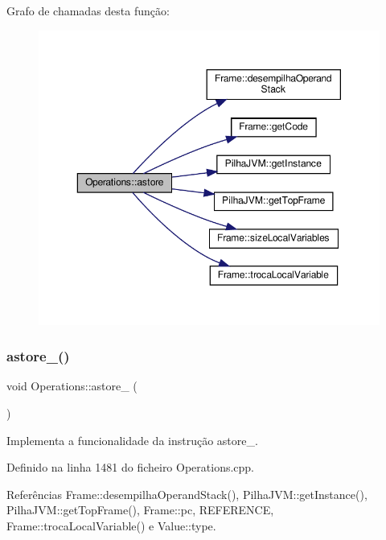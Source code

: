 Grafo de chamadas desta função\+:\nopagebreak
\begin{figure}[H]
\begin{center}
\leavevmode
\includegraphics[width=350pt]{classOperations_aa414424bd203fb9788712fd2e74c3a32_cgraph}
\end{center}
\end{figure}
\mbox{\label{classOperations_a140f2e8501424f8a73dbfecfa3ca859f}} 
\subsubsection{\texorpdfstring{astore\+\_()}{astore\_0()}}
{\footnotesize\ttfamily void Operations\+::astore\+\_ (\begin{DoxyParamCaption}{ }\end{DoxyParamCaption})\hspace{0.3cm}{\ttfamily [private]}}



Implementa a funcionalidade da instrução astore\+\_. 



Definido na linha 1481 do ficheiro Operations.\+cpp.



Referências Frame\+::desempilha\+Operand\+Stack(), Pilha\+J\+V\+M\+::get\+Instance(), Pilha\+J\+V\+M\+::get\+Top\+Frame(), Frame\+::pc, R\+E\+F\+E\+R\+E\+N\+CE, Frame\+::troca\+Local\+Variable() e Value\+::type.



